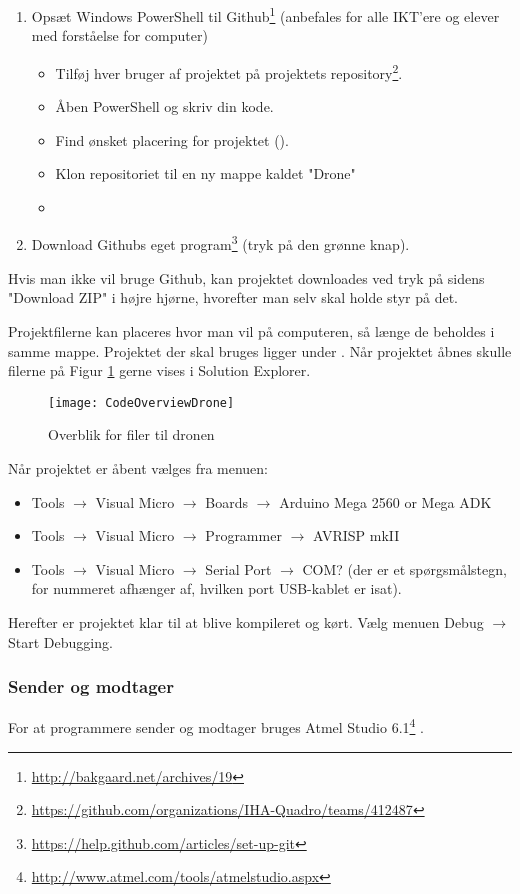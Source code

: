 \documentclass[Main]{subfiles}
\begin{document}
\begin{enumerate}
\item Opsæt Windows PowerShell til Github\footnote{\url{http://bakgaard.net/archives/19}} (anbefales for alle IKT'ere og elever med forståelse for computer)
	\begin{itemize}
	\item Tilføj hver bruger af projektet på projektets repository\footnote{\url{https://github.com/organizations/IHA-Quadro/teams/412487}}.
	\item Åben PowerShell og skriv din kode.
	\item Find ønsket placering for projektet ().
	\item Klon repositoriet til en ny mappe kaldet "Drone" 
	\item[] 
	\end{itemize}
\item Download Githubs eget program\footnote{\url{https://help.github.com/articles/set-up-git}} (tryk på den grønne knap).
\end{enumerate}

Hvis man ikke vil bruge Github, kan projektet downloades ved tryk på sidens "Download ZIP" i højre hjørne, hvorefter man selv skal holde styr på det.

Projektfilerne kan placeres hvor man vil på computeren, så længe de beholdes i samme mappe.
Projektet der skal bruges ligger under .
Når projektet åbnes skulle filerne på Figur \ref{Fig:CodeOverviewDrone} gerne vises i Solution Explorer.

\begin{figure}[H]
\centering
\texttt{[image: CodeOverviewDrone]}
\caption{Overblik for filer til dronen}
\label{Fig:CodeOverviewDrone}
\end{figure}


Når projektet er åbent vælges fra menuen:
\begin{itemize}
\item Tools $\rightarrow$ Visual Micro $\rightarrow$ Boards $\rightarrow$ Arduino Mega 2560 or Mega ADK
\item Tools $\rightarrow$ Visual Micro $\rightarrow$ Programmer $\rightarrow$ AVRISP mkII
\item Tools $\rightarrow$ Visual Micro $\rightarrow$ Serial Port $\rightarrow$ COM? (der er et spørgsmålstegn, for nummeret afhænger af, hvilken port USB-kablet er isat).
\end{itemize}

Herefter er projektet klar til at blive kompileret og kørt.
Vælg menuen Debug $\rightarrow$ Start Debugging.




\subsubsection{Sender og modtager}
For at programmere sender og modtager bruges Atmel Studio 6.1\footnote{\url{http://www.atmel.com/tools/atmelstudio.aspx}} .
\end{document}
